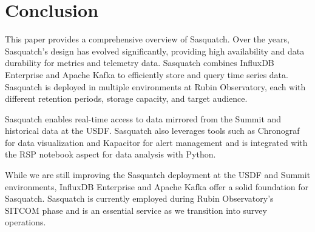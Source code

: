 \section{Conclusion}
\label{sec:conc}

This paper provides a comprehensive overview of Sasquatch. Over the years, Sasquatch's design has evolved significantly, providing high availability and data durability for metrics and telemetry data. Sasquatch combines InfluxDB Enterprise and Apache Kafka to efficiently store and query time series data. Sasquatch is deployed in multiple environments at Rubin Observatory, each with different retention periods, storage capacity, and target audience.

Sasquatch enables real-time access to data mirrored from the Summit and historical data at the USDF. Sasquatch also leverages tools such as Chronograf for data visualization and Kapacitor for alert management and is integrated with the RSP notebook aspect for data analysis with Python.

While we are still improving the Sasquatch deployment at the USDF and Summit environments, InfluxDB Enterprise and Apache Kafka offer a solid foundation for Sasquatch. Sasquatch is currently employed during Rubin Observatory's SITCOM phase and is an essential service as we transition into survey operations.

\vskip 0.4in

